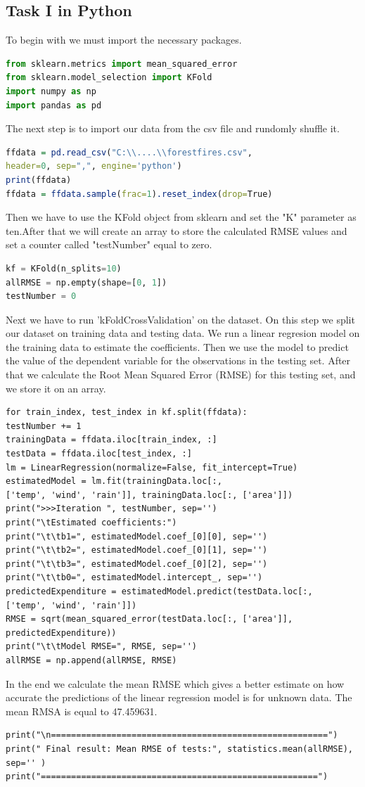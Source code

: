 \documentclass[10pt,a4paper]{article}
\begin{document}
	\subsection{Task I in Python}
	To begin with we must import the necessary packages.
	\begin{lstlisting}[language=Python]
from sklearn.metrics import mean_squared_error
from sklearn.model_selection import KFold
import numpy as np
import pandas as pd
	\end{lstlisting}
	The next step is to import our data from the csv file and rundomly shuffle it.
	\begin{lstlisting}[language=R]
ffdata = pd.read_csv("C:\\....\\forestfires.csv",
header=0, sep=",", engine='python')
print(ffdata)
ffdata = ffdata.sample(frac=1).reset_index(drop=True)
	\end{lstlisting}
Then we have to use the KFold object from sklearn and set the "K" parameter as ten.After that we will create an array to store the calculated RMSE values and set a counter called "testNumber" equal to zero.
	\begin{lstlisting}[language=Python]
kf = KFold(n_splits=10)
allRMSE = np.empty(shape=[0, 1])
testNumber = 0
	\end{lstlisting}
Next we have to run 'kFoldCrossValidation' on the dataset. On this step we split our dataset on  training data and testing data. We run a linear regresion model on the training data to estimate the coefficients. Then we use the model to predict the value of the dependent variable for the observations in the testing set. After that we calculate the Root Mean Squared Error (RMSE) for this testing set, and we store it on an array.
	\begin{lstlisting}
for train_index, test_index in kf.split(ffdata):
testNumber += 1
trainingData = ffdata.iloc[train_index, :]
testData = ffdata.iloc[test_index, :]
lm = LinearRegression(normalize=False, fit_intercept=True)
estimatedModel = lm.fit(trainingData.loc[:,
['temp', 'wind', 'rain']], trainingData.loc[:, ['area']])
print(">>>Iteration ", testNumber, sep='')
print("\tEstimated coefficients:")
print("\t\tb1=", estimatedModel.coef_[0][0], sep='')
print("\t\tb2=", estimatedModel.coef_[0][1], sep='')		
print("\t\tb3=", estimatedModel.coef_[0][2], sep='')
print("\t\tb0=", estimatedModel.intercept_, sep='')
predictedExpenditure = estimatedModel.predict(testData.loc[:,
['temp', 'wind', 'rain']])
RMSE = sqrt(mean_squared_error(testData.loc[:, ['area']],
predictedExpenditure))
print("\t\tModel RMSE=", RMSE, sep='')
allRMSE = np.append(allRMSE, RMSE)
	\end{lstlisting}
	In the end we calculate the mean RMSE which gives a better estimate on how accurate the predictions of the linear regression model is for unknown data. The mean RMSA is equal to 47.459631. \newpage
	\begin{lstlisting}
print("\n=======================================================")
print(" Final result: Mean RMSE of tests:", statistics.mean(allRMSE), sep='' )
print("=======================================================")
	\end{lstlisting} \newpage
\end{document}
